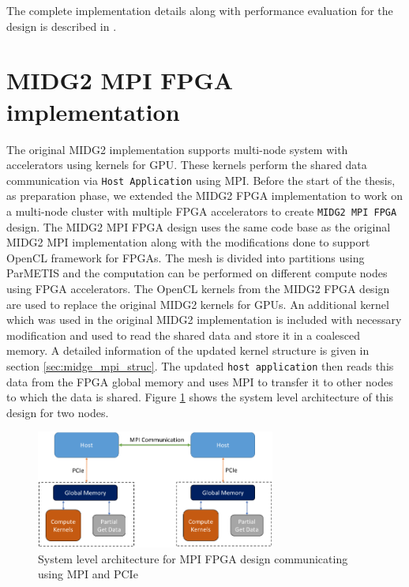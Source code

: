 The complete implementation details along with performance evaluation for the design
is described in \cite{kenter_opencl-based_2018}.

\section{MIDG2 MPI FPGA implementation}
\label{sec:midg2_mpi}

The original MIDG2 implementation supports multi-node system with accelerators using
kernels for GPU. These kernels perform the shared data communication via \texttt{Host Application}
using MPI. Before the start of the thesis, as preparation phase, we extended the MIDG2 FPGA
implementation to work on a multi-node cluster with multiple FPGA accelerators to create \texttt{MIDG2 MPI FPGA} design.
The MIDG2 \ac{MPI} FPGA design uses the same code base as the original MIDG2 \ac{MPI} implementation
along with the modifications done to support OpenCL framework for FPGAs.
The mesh is divided into partitions using ParMETIS and the computation can be performed on different
compute nodes using FPGA accelerators. The OpenCL kernels from the MIDG2 FPGA design are used to replace
the original MIDG2 kernels for GPUs. An additional kernel which was used in the original MIDG2
implementation is included with necessary modification and used to read the shared data and store it in a coalesced
memory. A detailed information of the updated kernel structure is given in section \ref{sec:midge_mpi_struc}.
The updated \texttt{host application} then reads this data from the FPGA global memory and uses
\ac{MPI} to transfer it to other nodes to which the data is shared. Figure
\ref{fig:mpi_fpga} shows the system level architecture of this design for two nodes.
\begin{figure}[ht]%
    \centering
    \includegraphics[width=0.7\textwidth]{images/mpi_fpga}
    \caption{System level architecture for MPI FPGA design communicating using MPI and PCIe}
    \label{fig:mpi_fpga}
\end{figure}

